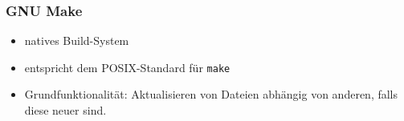 \begin{frame}
	\frametitle{GNU Make}
	\begin{itemize}
		\item natives Build-System
		\item entspricht dem POSIX-Standard für \texttt{make}
		\item Grundfunktionalität: Aktualisieren von Dateien abhängig von anderen, falls diese neuer sind.
	\end{itemize}
\end{frame}
